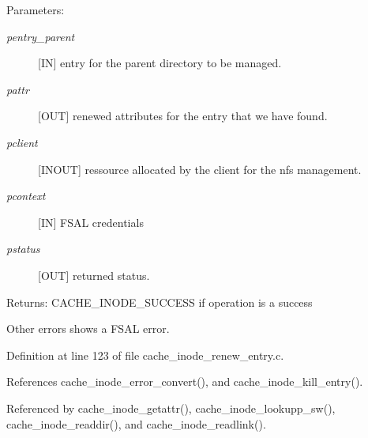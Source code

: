 \begin{Desc}
\item[Parameters:]
\begin{description}
\item[{\em pentry\_\-parent}][IN] entry for the parent directory to be managed. \item[{\em pattr}][OUT] renewed attributes for the entry that we have found. \item[{\em pclient}][INOUT] ressource allocated by the client for the nfs management. \item[{\em pcontext}][IN] FSAL credentials \item[{\em pstatus}][OUT] returned status.\end{description}
\end{Desc}
\begin{Desc}
\item[Returns:]CACHE\_\-INODE\_\-SUCCESS if operation is a success \par
 

Other errors shows a FSAL error. \end{Desc}


Definition at line 123 of file cache\_\-inode\_\-renew\_\-entry.c.

References cache\_\-inode\_\-error\_\-convert(), and cache\_\-inode\_\-kill\_\-entry().

Referenced by cache\_\-inode\_\-getattr(), cache\_\-inode\_\-lookupp\_\-sw(), cache\_\-inode\_\-readdir(), and cache\_\-inode\_\-readlink().
